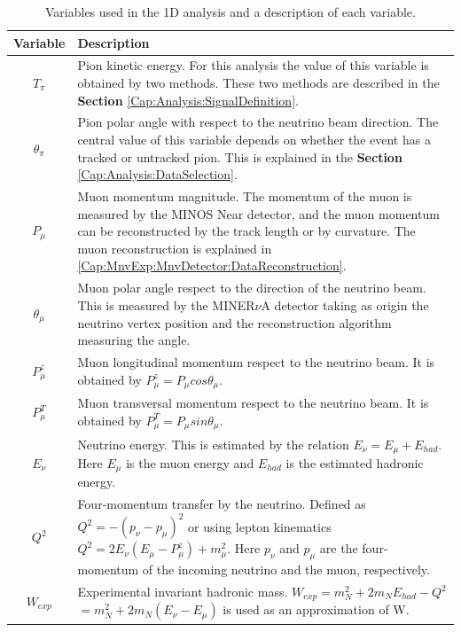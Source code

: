 \begin{table}[!htb]
    \centering
    \begin{tabular}{c|p{4.6in}}
        \hline
        Variable & Description \\ \hline
        $T_\pi$      & Pion kinetic energy. For this analysis the value of this variable is  obtained by two methods. These two methods are described in the \textbf{Section} \ref{Cap:Analysis:SignalDefinition}. \\ 
        \hline
        $\theta_\pi$ & Pion polar angle with respect to the neutrino beam direction. The central value of this variable depends on whether the event has a tracked or untracked pion. This is explained in the \textbf{Section} \ref{Cap:Analysis:DataSelection}. \\
        \hline
        $P_\mu$      & Muon momentum magnitude. The momentum of the muon is measured by the MINOS Near detector, and the muon momentum can be reconstructed by the track length or by curvature. The muon reconstruction is explained in \ref{Cap:MnvExp:MnvDetector:DataReconstruction}. \\
        \hline
        $\theta_\mu$ & Muon polar angle respect to the direction of the neutrino beam. This is measured by the MINER$\nu$A detector taking as origin the neutrino vertex position and the reconstruction algorithm measuring the angle.\\
        \hline
        $P^z_\mu$    & Muon longitudinal momentum respect to the neutrino beam. It is obtained by $P^z_\mu = P_\mu cos \theta_\mu$. \\
        \hline
        $P^T_\mu$    & Muon transversal momentum respect to the neutrino beam. It is obtained by $P^T_\mu = P_\mu sin \theta_\mu$. \\
        \hline
        $E_\nu$      & Neutrino energy. This is estimated by the relation $E_\nu = E_\mu + E_{had}$. Here $E_\mu$ is the muon energy and $E_{had}$ is the estimated hadronic energy. \\
        \hline
        $Q^2$        & Four-momentum transfer by the neutrino. Defined as $Q^2 = - (p_\nu -p_\mu)^2$ or using lepton kinematics $Q^2 = 2E_\nu(E_\mu-P^z_\mu) + m^2_\mu$. Here $p_\nu$ and $p_\mu$ are the four-momentum of the incoming neutrino and the muon, respectively.\\ 
        \hline
        $W_{exp}$    & Experimental invariant hadronic mass. $W_{exp} = m^2_N + 2m_NE_{had} - Q^2$ $= m^2_N + 2m_N(E_\nu-E_\mu)$ is used as an approximation of W.\\
        \hline
    \end{tabular}
    \caption{Variables used in the 1D analysis and a description of each variable.}
    \label{tab:Analisys:AnaVariables:1Danalysis}
\end{table}

